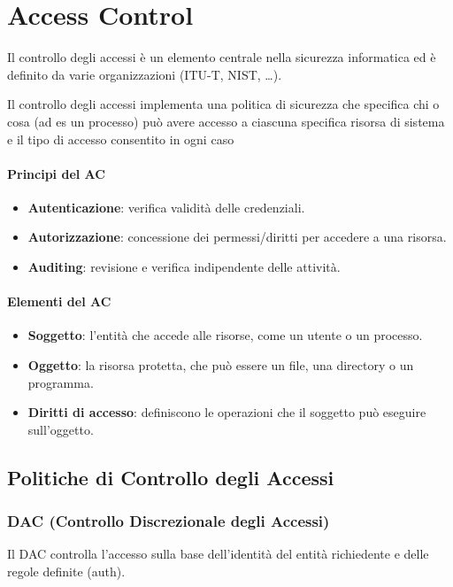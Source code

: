 \chapter{Access Control}

Il controllo degli accessi è un elemento centrale nella sicurezza informatica ed è definito da varie organizzazioni (ITU-T, NIST, \dots).

Il controllo degli accessi implementa una politica di sicurezza che specifica chi o
cosa (ad es un processo) può avere accesso a ciascuna specifica risorsa di sistema
e il tipo di accesso consentito in ogni caso

\subsubsection{Principi del AC}
\begin{itemize}
    \item \textbf{Autenticazione}: verifica validità delle credenziali.
    \item \textbf{Autorizzazione}: concessione dei permessi/diritti per accedere a una risorsa.
    \item \textbf{Auditing}: revisione e verifica indipendente delle attività.
\end{itemize}

\subsubsection{Elementi del AC}
\begin{itemize}
    \item \textbf{Soggetto}: l'entità che accede alle risorse, come un utente o un processo.
    \item \textbf{Oggetto}: la risorsa protetta, che può essere un file, una directory o un programma.
    \item \textbf{Diritti di accesso}: definiscono le operazioni che il soggetto può eseguire sull'oggetto.
\end{itemize}

\section{Politiche di Controllo degli Accessi}

\subsection{DAC (Controllo Discrezionale degli Accessi)}
Il DAC controlla l'accesso sulla base dell'identità del entità richiedente e delle regole definite (auth).

